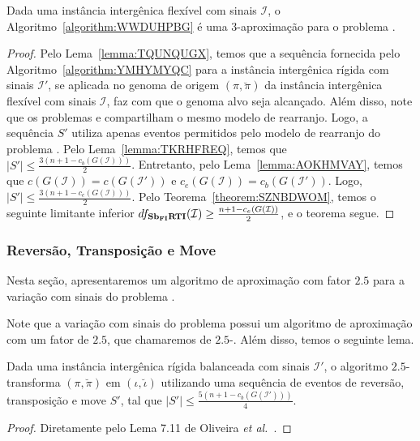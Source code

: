 \begin{theorem}\label{theorem:IRGQGPKZ}
Dada uma instância intergênica flexível com sinais $\mathcal{I}$, o Algoritmo~\ref{algorithm:WWDUHPBG} é uma $3$-aproximação para o problema \SbFIRTI{}.
\end{theorem}
\begin{proof}
Pelo Lema~\ref{lemma:TQUNQUGX}, temos que a sequência fornecida pelo Algoritmo~\ref{algorithm:YMHYMYQC} para a instância intergênica rígida com sinais $\mathcal{I'}$, se aplicada no genoma de origem $(\pi,\breve\pi)$ da instância intergênica flexível com sinais $\mathcal{I}$, faz com que o genoma alvo seja alcançado. Além disso, note que os problemas \SbIRTI{} e \SbFIRTI{} compartilham o mesmo modelo de rearranjo. Logo, a sequência $S'$ utiliza apenas eventos permitidos pelo modelo de rearranjo do problema \SbFIRTI{}. Pelo Lema~\ref{lemma:TKRHFREQ}, temos que $|S'| \le \frac{3(n+1 - c_b(G(\mathcal{I})))}{2}$. Entretanto, pelo Lema~\ref{lemma:AOKHMVAY}, temos que $c(G(\mathcal{I})) = c(G(\mathcal{I}'))$ e $c_e(G(\mathcal{I})) = c_b(G(\mathcal{I}'))$. Logo, $|S'| \le \frac{3(n+1 - c_e(G(\mathcal{I})))}{2}$. Pelo Teorema~\ref{theorem:SZNBDWOM}, temos o seguinte limitante inferior $df_{\textbf{Sb\textsubscript{FI}RTI}}(\mathcal{I}) \ge \frac{n+1 - c_e(G(\mathcal{I}))}{2}$, e o teorema segue.
\end{proof}

\subsubsection{Reversão, Transposição e Move}

Nesta seção, apresentaremos um algoritmo de aproximação com fator $2.5$ para a variação com sinais do problema \SbFIRTM{}. 

Note que a variação com sinais do problema \SbIRTM{} possui um algoritmo de aproximação com um fator de $2.5$, que chamaremos de $2.5$-\SbIRTM{}. Além disso, temos o seguinte lema.

\begin{lemma}\label{lemma:TPROVWMO}
Dada uma instância intergênica rígida balanceada com sinais $\mathcal{I}'$, o algoritmo $2.5$-\SbIRTM{} transforma $(\pi,\breve\pi)$ em $(\iota,\breve\iota)$ utilizando uma sequência de eventos de reversão, transposição e move $S'$, tal que $|S'| \le \frac{5({n+1} - c_b(G(\mathcal{I}')))}{4}$.
\end{lemma}
\begin{proof}
Diretamente pelo Lema 7.11 de Oliveira \textit{et al.}~\cite{2021a-oliveira-etal}.
\end{proof}

